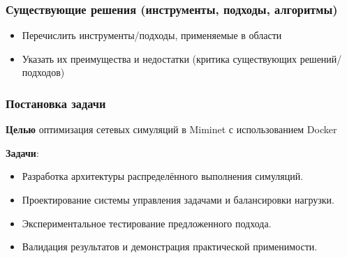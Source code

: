 \documentclass{beamer}
\begin{document}
\begin{frame}
  \frametitle{Существующие решения (инструменты, подходы, алгоритмы)}
  \begin{itemize}
    \item Перечислить инструменты/подходы, применяемые в области
    \item Указать их преимущества и недостатки (критика существующих решений/подходов)
  \end{itemize}

\end{frame}



\begin{frame}
  \frametitle{Постановка задачи}
  \textbf{Целью} оптимизация сетевых симуляций в Miminet с использованием Docker %

  \textbf{Задачи}:
  \begin{itemize}
    \item Разработка архитектуры распределённого выполнения симуляций.
    \item Проектирование системы управления задачами и балансировки нагрузки.
    \item Экспериментальное тестирование предложенного подхода.
    \item Валидация результатов и демонстрация практической применимости.
\end{itemize}
\end{frame}
\end{document}
